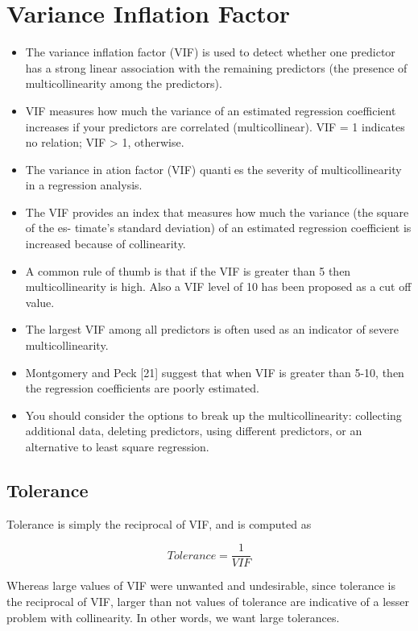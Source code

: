 \documentclass[]{report}
\begin{document}
\section*{Variance Inflation Factor}
\begin{itemize}
	\item The variance inflation factor (VIF) is used to detect whether one predictor has a strong linear
	association with the remaining predictors (the presence of multicollinearity among the
	predictors). 
	\item VIF measures how much the variance of an estimated regression coefficient
	increases if your predictors are correlated (multicollinear).
	VIF = 1 indicates no relation; VIF > 1, otherwise.
	\item The variance in
	ation factor (VIF) quanties the severity of multicollinearity in a regression
	analysis.
	\item The VIF provides an index that measures how much the variance (the square of the es-
	timate's standard deviation) of an estimated regression coefficient is increased because of
	collinearity.
	\item A common rule of thumb is that if the VIF is greater than 5 then multicollinearity is high.
	Also a VIF level of 10 has been proposed as a cut off value.	
	\item The largest VIF among all predictors is often used as an indicator of severe multicollinearity. 
	\item Montgomery and Peck [21] suggest that when VIF is greater than 5-10, then the regression coefficients are poorly estimated. \item You should
	consider the options to break up the multicollinearity: collecting additional data, deleting
	predictors, using different predictors, or an alternative to least square regression.
\end{itemize}


\subsection*{Tolerance}
Tolerance is simply the reciprocal of VIF, and is computed as


\[ Tolerance = \frac{1}{VIF}\]

Whereas large values of VIF were unwanted and undesirable, since tolerance is the reciprocal
of VIF, larger than not values of tolerance are indicative of a lesser problem with collinearity.
In other words, we want large tolerances.
\newpage
\end{document}
